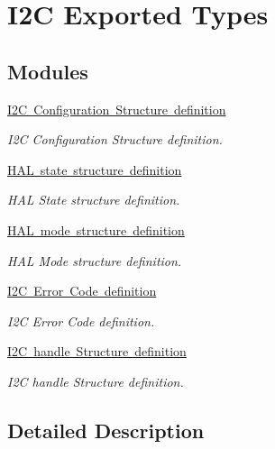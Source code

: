 \hypertarget{group___i2_c___exported___types}{}\section{I2C Exported Types}
\label{group___i2_c___exported___types}
\subsection*{Modules}
\begin{DoxyCompactItemize}
\item 
\mbox{\hyperlink{group___i2_c___configuration___structure__definition}{I2\+C Configuration Structure definition}}
\begin{DoxyCompactList}\small\item\em I2C Configuration Structure definition. \end{DoxyCompactList}\item 
\mbox{\hyperlink{group___h_a_l__state__structure__definition}{H\+A\+L state structure definition}}
\begin{DoxyCompactList}\small\item\em H\+AL State structure definition. \end{DoxyCompactList}\item 
\mbox{\hyperlink{group___h_a_l__mode__structure__definition}{H\+A\+L mode structure definition}}
\begin{DoxyCompactList}\small\item\em H\+AL Mode structure definition. \end{DoxyCompactList}\item 
\mbox{\hyperlink{group___i2_c___error___code__definition}{I2\+C Error Code definition}}
\begin{DoxyCompactList}\small\item\em I2C Error Code definition. \end{DoxyCompactList}\item 
\mbox{\hyperlink{group___i2_c__handle___structure__definition}{I2\+C handle Structure definition}}
\begin{DoxyCompactList}\small\item\em I2C handle Structure definition. \end{DoxyCompactList}\end{DoxyCompactItemize}


\subsection{Detailed Description}
